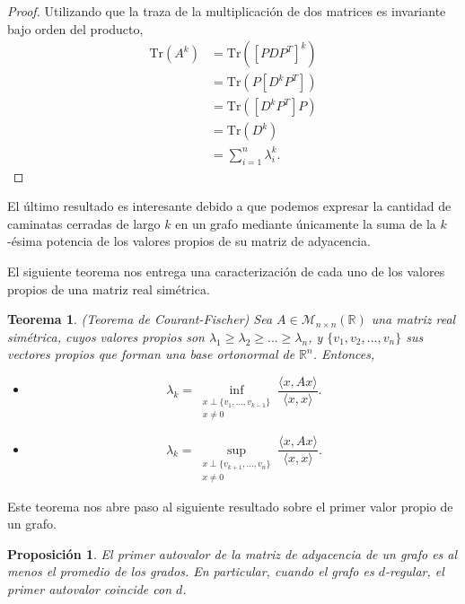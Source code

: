 \documentclass{article}[14pts]
\newtheorem{teorema}{Teorema}
\newtheorem{prop}{Proposición}
\newcommand{\Tr}{\mathrm{Tr}}
\begin{document}
\begin{proof}
    Utilizando que la traza de la multiplicación de dos matrices es invariante bajo orden del producto, 
    \begin{align*}
        \Tr(A^{k}) &= \Tr([PDP^{T}]^{k})\\
        &= \Tr(P[D^{k}P^{T}])\\
        &= \Tr([D^{k}P^{T}]P)\\
        &= \Tr(D^{k})\\
        &= \sum_{i = 1}^{n}\lambda_{i}^{k}.
    \end{align*}
\end{proof}

El último resultado es interesante debido a que podemos expresar la cantidad de caminatas cerradas de largo $k$ en un grafo mediante únicamente la suma de la $k$-ésima potencia de los valores propios de su matriz de adyacencia.\medskip

El siguiente teorema nos entrega una caracterización de cada uno de los valores propios de una matriz real simétrica.

\begin{teorema} \label{Teo Courant-Fischer}(Teorema de Courant-Fischer)
    Sea $A\in \mathcal{M}_{n\times n}(\mathbb{R})$ una matriz real simétrica, cuyos valores propios son $\lambda_1 \geq \lambda_2 \geq ...\geq \lambda_n$, y $\lbrace v_1, v_2,..., v_n \rbrace$ sus vectores propios que forman una base ortonormal de $\mathbb{R}^{n}$. Entonces,
    \begin{itemize}
        \item[(i)] \[
                \lambda_k = \inf_{\substack{x\perp \lbrace v_1,...,v_{k-1}\rbrace \\ x\not= 0}} \frac{\langle x, Ax\rangle}{\langle x,x\rangle}.
              \]
        \item[(ii)] \[
                \lambda_k = \sup_{\substack{x\perp \lbrace v_{k+1},...,v_n\rbrace \\ x\not= 0}} \frac{\langle x, Ax\rangle}{\langle x,x\rangle}.
              \]
    \end{itemize}
\end{teorema}

Este teorema nos abre paso al siguiente resultado sobre el primer valor propio de un grafo.

\begin{prop}\label{cota_primer_autovalor}
    El primer autovalor de la matriz de adyacencia de un grafo es al menos el promedio de los grados. En particular, cuando el grafo es $d$-regular, el primer autovalor coincide con $d$.
\end{prop}
\end{document}
